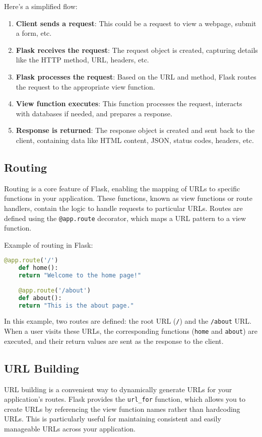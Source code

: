 Here’s a simplified flow:
\begin{enumerate}
	\item \textbf{Client sends a request}: This could be a request to view a webpage, submit a form, etc.
	\item \textbf{Flask receives the request}: The request object is created, capturing details like the HTTP method, URL, headers, etc.
	\item \textbf{Flask processes the request}: Based on the URL and method, Flask routes the request to the appropriate view function.
	\item \textbf{View function executes}: This function processes the request, interacts with databases if needed, and prepares a response.
	\item \textbf{Response is returned}: The response object is created and sent back to the client, containing data like HTML content, JSON, status codes, headers, etc.\cite{Flaskdocs:2024}
\end{enumerate}

\subsection{Routing}
Routing is a core feature of Flask, enabling the mapping of URLs to specific functions in your application. These functions, known as view functions or route handlers, contain the logic to handle requests to particular URLs. Routes are defined using the \texttt{@app.route} decorator, which maps a URL pattern to a view function.

Example of routing in Flask:
\begin{lstlisting}[language=Python]
	@app.route('/')
	def home():
	return "Welcome to the home page!"
	
	@app.route('/about')
	def about():
	return "This is the about page."
\end{lstlisting}

In this example, two routes are defined: the root URL (\texttt{/}) and the \texttt{/about} URL. When a user visits these URLs, the corresponding functions (\texttt{home} and \texttt{about}) are executed, and their return values are sent as the response to the client.\cite{Flaskdocs:2024}

\subsection{URL Building}
URL building is a convenient way to dynamically generate URLs for your application’s routes. Flask provides the \texttt{url\_for} function, which allows you to create URLs by referencing the view function names rather than hardcoding URLs. This is particularly useful for maintaining consistent and easily manageable URLs across your application.

